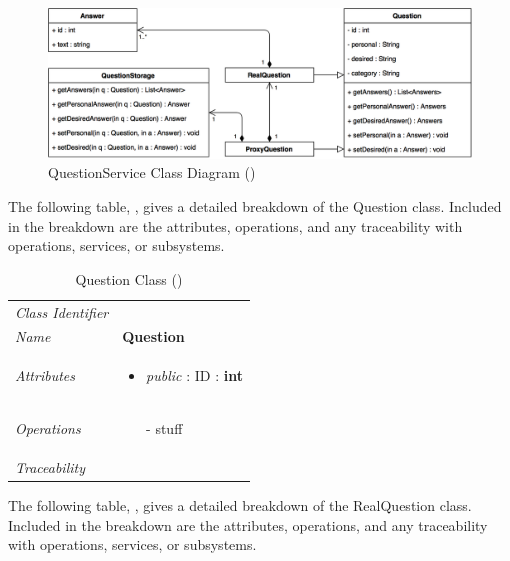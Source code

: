 \documentclass[12pt,letterpaper]{article}
\begin{document}
\begin{figure}[H]
	\centering{}
	\includegraphics[scale=0.32]{imgs/d3/interfaces/question.png}
	\caption{QuestionService Class Diagram ()}
\end{figure}

The following table, , gives a detailed breakdown of the Question class. Included in the breakdown are the attributes, operations, and any traceability with operations, services, or subsystems.

\begin{table}[H]
    \caption{Question Class ()} 
	\begin{tabu} to 
		\toprule
		Class Identifier &  \\
		Name & {\bf Question} \\
		Attributes & 
		\begin{minipage}[t]{\linewidth}
		    \begin{itemize}
		        \item \textit{public} : ID : \bf{int}
			\end{itemize}
	    \end{minipage} \\

		Operations &
		\begin{minipage}[t]{\linewidth}
			\begin{enumerate}
			    \item[-] stuff
	        \end{enumerate}
	    \end{minipage} \\
	    	Traceability & \\
		\toprule
	\end{tabu}
\end{table}

The following table, , gives a detailed breakdown of the RealQuestion class. Included in the breakdown are the attributes, operations, and any traceability with operations, services, or subsystems.
\end{document}
